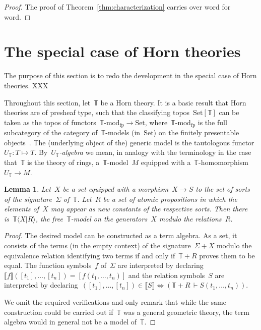 \documentclass[oneside,reqno]{amsart}
\theoremstyle{definition}
\theoremstyle{plain}
\newtheorem{lemma}[defn]{Lemma}
\theoremstyle{remark}
\newcommand{\TT}{\mathbb{T}}
\newcommand{\Set}{\mathrm{Set}}
\renewcommand{\_}{\mathpunct{.}\,}
\newcommand{\?}{\,{:}\,}
\newcommand{\brak}[1]{\llbracket #1 \rrbracket}
\newcommand{\Mod}[1]{{#1}\mathrm{\text{-}mod}}
\begin{document}
\begin{proof}The proof of Theorem~\ref{thm:characterization} carries over word
for word.
\end{proof}


\section{The special case of Horn theories}
\label{sect:horn}

The purpose of this section is to redo the development in the special case of
Horn theories. XXX

Throughout this section, let~$\TT$ be a Horn theory. It is a basic result that
Horn theories are of presheaf type, such that the classifying topos~$\Set[\TT]$
can be taken as the topos of functors~$\Mod{\TT}_\mathrm{fp} \to \Set$,
where~$\Mod{\TT}_\mathrm{fp}$ is the full subcategory of the category
of~$\TT$-models (in~$\Set$) on the finitely presentable objects~\cite[Theorem~2.1.21]{caramello:tst}. The
(underlying object of the) generic model is the tautologous functor~$U_\TT : T
\mapsto T$. By~\emph{$U_\TT$-algebra} we mean, in analogy with the terminology in
the case that~$\TT$ is the theory of rings, a~$\TT$-model~$M$ equipped with
a~$\TT$-homomorphism~$U_\TT \to M$.


\begin{lemma}\label{lemma:free-models}
Let~$X$ be a set equipped with a morphism~$X \to S$ to the set of sorts
of the signature~$\Sigma$ of~$\TT$. Let~$R$ be a set of atomic propositions in which the
elements of~$X$ may appear as new constants of the respective sorts. Then there
is~$\TT\langle X | R \rangle$, the free~$\TT$-model on the generators~$X$ modulo
the relations~$R$.\end{lemma}

\begin{proof}The desired model can be constructed as a term algebra. As a set,
it consists of the terms (in the empty context) of the signature~$\Sigma + X$
modulo the equivalence relation identifying two terms if and only if~$\TT + R$
proves them to be equal. The function symbols~$f$ of~$\Sigma$ are interpreted
by declaring~$\brak{f}([t_1],\ldots,[t_n]) = [f(t_1,\ldots,t_n)]$ and the
relation symbols~$S$ are interpreted by declaring~$([t_1],\ldots,[t_n]) \in
\brak{S} \Leftrightarrow (\TT + R \,\vdash S(t_1,\ldots,t_n))$.

We omit the required verifications and only remark that while the same
construction could be carried out if~$\TT$ was a general geometric theory, the
term algebra would in general not be a model of~$\TT$.
\end{proof}
\end{document}
